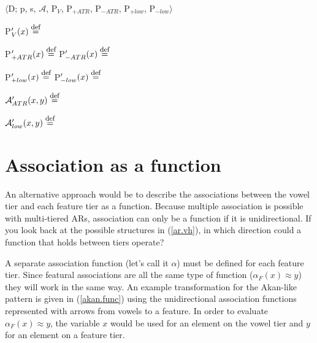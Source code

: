 \documentclass[,doc,floatsintext]{apa6}
\def\defeq{\mathrel{\buildrel \mbox{\footnotesize def} \over =}}
\theoremstyle{definition}
\theoremstyle{definition}
\theoremstyle{definition}
\theoremstyle{remark}
\begin{document}
\begin{exe}
\ex\label{qflfp.spread} $\langle$D; p, s, $\mathcal{A}$, P$_V$, P$_{+ATR}$, P$_{-ATR}$, P$_{+low}$, P$_{-low}\rangle$ 
\end{exe}

P\('_{V}(x) \defeq\) \vspace{0.5in}

P\('_{+ATR}(x) \defeq\) \hspace{2.25in} P\('_{-ATR}(x) \defeq\)
\vspace{0.5in}

P\('_{+low}(x) \defeq\) \hspace{2.25in} P\('_{-low}(x) \defeq\)
\vspace{0.5in}

\(\mathcal{A}_{ATR}'(x, y) \defeq\) \vspace{0.5in}

\(\mathcal{A}_{low}'(x, y) \defeq\) \vspace{0.5in}

\section{Association as a function}\label{association-as-a-function}

An alternative approach would be to describe the associations between
the vowel tier and each feature tier as a function. Because multiple
association is possible with multi-tiered ARs, association can only be a
function if it is unidirectional. If you look back at the possible
structures in (\ref{ar.vh}), in which direction could a function that
holds between tiers operate?

A separate association function (let's call it \(\alpha\)) must be
defined for each feature tier. Since featural associations are all the
same type of function (\(\alpha_F(x)\approx y\)) they will work in the
same way. An example transformation for the Akan-like pattern is given
in (\ref{akan.func}) using the unidirectional association functions
represented with arrows from vowels to a feature. In order to evaluate
\(\alpha_F(x)\approx y\), the variable \(x\) would be used for an
element on the vowel tier and \(y\) for an element on a feature tier.
\end{document}
